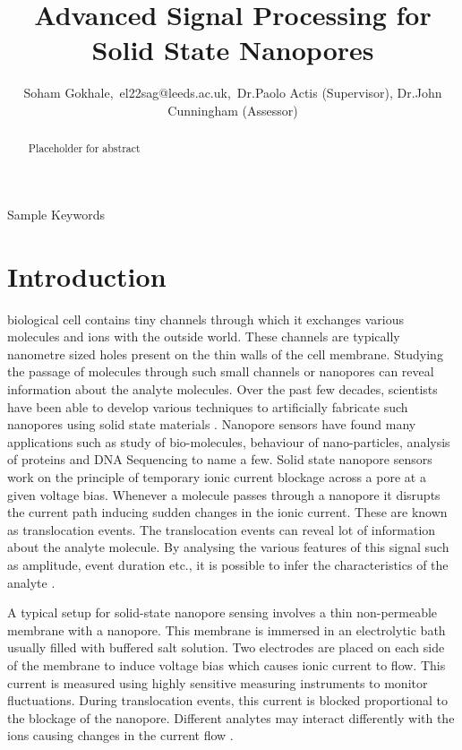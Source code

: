 \documentclass[journal]{IEEEtran}
\begin{document}
\title{Advanced Signal Processing for Solid State Nanopores}
\author{Soham Gokhale,\ el22sag@leeds.ac.uk,\ Dr.Paolo Actis (Supervisor), Dr.John Cunningham (Assessor)}


\maketitle

\begin{abstract}
Placeholder for abstract
\end{abstract}

\begin{IEEEkeywords}
Sample Keywords
\end{IEEEkeywords}

\section{Introduction}
 biological cell contains tiny channels through which it exchanges various molecules and ions with the outside world. These channels are typically nanometre sized holes present on the thin walls of the cell membrane. Studying the passage of molecules through such small channels or nanopores can reveal information about the analyte molecules. Over the past few decades, scientists have been able to develop various techniques to artificially fabricate such nanopores using solid state materials \cite{dekkerSolidstateNanopores2007,xueSolidstateNanoporeSensors2020}. Nanopore sensors have found many applications such as study of bio-molecules, behaviour of nano-particles, analysis of proteins \cite{luoApplicationSolidStateNanopore2020} and DNA Sequencing \cite{deamerThreeDecadesNanopore2016} to name a few. Solid state nanopore sensors work on the principle of temporary ionic current blockage across a pore at a given voltage bias. Whenever a molecule passes through a nanopore it disrupts the current path inducing sudden changes in the ionic current. These are known as translocation events. The translocation events can reveal lot of information about the analyte molecule. By analysing the various features of this signal such as amplitude, event duration etc., it is possible to infer the characteristics of the analyte \cite{wenGuideSignalProcessing2021}.

A typical setup for solid-state nanopore sensing involves a thin non-permeable membrane with a nanopore. This membrane is immersed in an electrolytic bath usually filled with buffered salt solution. Two electrodes are placed on each side of the membrane to induce voltage bias which causes ionic current to flow. This current is measured using highly sensitive measuring instruments to monitor fluctuations. During translocation events, this current is blocked proportional to the blockage of the nanopore. Different analytes may interact differently with the ions causing changes in the current flow \cite{xueSolidstateNanoporeSensors2020}.
\end{document}

